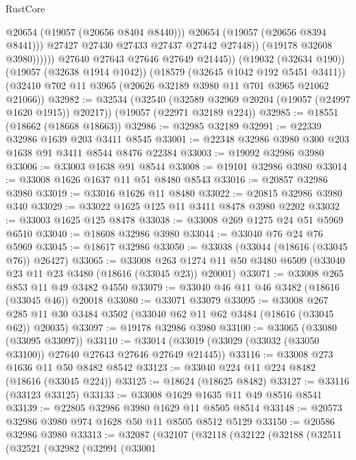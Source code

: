 \begin{lexlean}{RustCore}
\begin{coremodule}
                          @20654
                          (@19057 (@20656 @8404 @8440)))
                        @20654
                        (@19057 (@20656 @8394 @8441)))
                      @27427
                      @27430
                      @27433
                      @27437
                      @27442
                      @27448))
                  (@19178 @32608 @3980))))))
        @27640
        @27643
        @27646
        @27649
        @21445))
    (@19032 (@32634 @190))
    (@19057 (@32638 @1914 @1042))
    (@18579 (@32645 @1042 @192 @5451 @3411))
    (@32410 @702 @11 @3965 (@20626 @32189 @3980 @11 @701 @3965 @21062 @21066))
@32982 := @32534
    (@32540 (@32589 @32969 @20204 (@19057 (@24997 @1620 @1915)) @20217))
    (@19057 (@22971 @32189 @224))
@32985 := @18551 (@18662 (@18668 @18663))
@32986 := @32985 @32189
@32991 := @22339 @32986 @1639 @203 @3411 @8545
@33001 := @22348 @32986 @3980 @300 @203 @1638 @91 @3411 @8544 @8476 @22384
@33003 := @19092 @32986 @3980
@33006 := @33003 @1638 @91 @8544
@33008 := @19101 @32986 @3980
@33014 := @33008 @1626 @1637 @11 @51 @8480 @8543
@33016 := @20857 @32986 @3980
@33019 := @33016 @1626 @11 @8480
@33022 := @20815 @32986 @3980 @340
@33029 := @33022 @1625 @125 @11 @3411 @8478 @3980 @2202
@33032 := @33003 @1625 @125 @8478
@33038 := @33008 @269 @1275 @24 @51 @5969 @6510
@33040 := @18608 @32986 @3980
@33044 := @33040 @76 @24 @76 @5969
@33045 := @18617 @32986
@33050 := @33038 (@33044 (@18616 (@33045 @76)) @26427)
@33065 := @33008
    @263
    @1274
    @11
    @50
    @3480
    @6509
    (@33040 @23 @11 @23 @3480 (@18616 (@33045 @23)) @20001)
@33071 := @33008 @265 @853 @11 @49 @3482 @4550
@33079 := @33040 @46 @11 @46 @3482 (@18616 (@33045 @46)) @20018
@33080 := @33071 @33079
@33095 := @33008
    @267
    @285
    @11
    @30
    @3484
    @3502
    (@33040 @62 @11 @62 @3484 (@18616 (@33045 @62)) @20035)
@33097 := @19178 @32986 @3980
@33100 := @33065 (@33080 (@33095 @33097))
@33110 := @33014 (@33019 (@33029 (@33032 (@33050 @33100)) @27640 @27643 @27646 @27649 @21445))
@33116 := @33008 @273 @1636 @11 @50 @8482 @8542
@33123 := @33040 @224 @11 @224 @8482 (@18616 (@33045 @224))
@33125 := @18624 (@18625 @8482)
@33127 := @33116 (@33123 @33125)
@33133 := @33008 @1629 @1635 @11 @49 @8516 @8541
@33139 := @22805 @32986 @3980 @1629 @11 @8505 @8514
@33148 := @20573 @32986 @3980 @974 @1628 @50 @11 @8505 @8512 @5129
@33150 := @20586 @32986 @3980
@33313 := @32087
    (@32107
      (@32118
        (@32122
          (@32188
            (@32511
              (@32521
                (@32982
                  (@32991
                    (@33001

\end{coremodule}
\end{lexlean}
